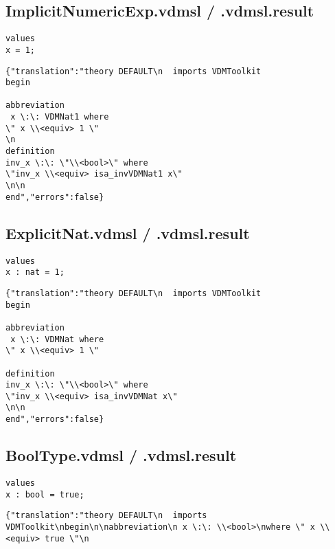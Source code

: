 \begin{appendices}
\subsection{ImplicitNumericExp.vdmsl / .vdmsl.result}
\begin{lstlisting}
values
x = 1;
\end{lstlisting}

\begin{lstlisting}
{"translation":"theory DEFAULT\n  imports VDMToolkit
begin

abbreviation
 x \:\: VDMNat1 where 
\" x \\<equiv> 1 \" 
\n
definition
inv_x \:\: \"\\<bool>\" where
\"inv_x \\<equiv> isa_invVDMNat1 x\"
\n\n
end","errors":false}
\end{lstlisting}

\subsection{ExplicitNat.vdmsl / .vdmsl.result}
\begin{lstlisting}
values
x : nat = 1;

\end{lstlisting}

\begin{lstlisting}
{"translation":"theory DEFAULT\n  imports VDMToolkit
begin

abbreviation
 x \:\: VDMNat where 
\" x \\<equiv> 1 \" 

definition
inv_x \:\: \"\\<bool>\" where
\"inv_x \\<equiv> isa_invVDMNat x\"
\n\n
end","errors":false}
\end{lstlisting}

\subsection{BoolType.vdmsl / .vdmsl.result}
\begin{lstlisting}
values
x : bool = true;

\end{lstlisting}

\begin{lstlisting}
{"translation":"theory DEFAULT\n  imports VDMToolkit\nbegin\n\nabbreviation\n x \:\: \\<bool>\nwhere \" x \\<equiv> true \"\n


\end{lstlisting}
\end{appendices}
